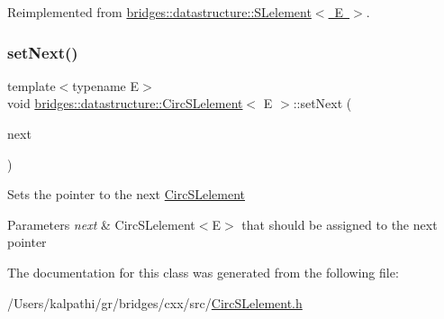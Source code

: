 Reimplemented from \mbox{\hyperlink{classbridges_1_1datastructure_1_1_s_lelement_ae43dd771d9ced7cb17f1d35f34cd9a42}{bridges\+::datastructure\+::\+S\+Lelement$<$ E $>$}}.

\mbox{\label{classbridges_1_1datastructure_1_1_circ_s_lelement_a623d302217fce43a444e6da5e1de9b40}} 
\subsubsection{\texorpdfstring{setNext()}{setNext()}}
{\footnotesize\ttfamily template$<$typename E$>$ \\
void \mbox{\hyperlink{classbridges_1_1datastructure_1_1_circ_s_lelement}{bridges\+::datastructure\+::\+Circ\+S\+Lelement}}$<$ E $>$\+::set\+Next (\begin{DoxyParamCaption}\item[{\mbox{\hyperlink{classbridges_1_1datastructure_1_1_circ_s_lelement}{Circ\+S\+Lelement}}$<$ E $>$ $\ast$}]{next }\end{DoxyParamCaption})\hspace{0.3cm}{\ttfamily [inline]}}

Sets the pointer to the next \mbox{\hyperlink{classbridges_1_1datastructure_1_1_circ_s_lelement}{Circ\+S\+Lelement}} 
\begin{DoxyParams}{Parameters}
{\em next} & Circ\+S\+Lelement$<$\+E$>$ that should be assigned to the next pointer \\
\hline
\end{DoxyParams}


The documentation for this class was generated from the following file\+:\begin{DoxyCompactItemize}
\item 
/\+Users/kalpathi/gr/bridges/cxx/src/\mbox{\hyperlink{_circ_s_lelement_8h}{Circ\+S\+Lelement.\+h}}\end{DoxyCompactItemize}
